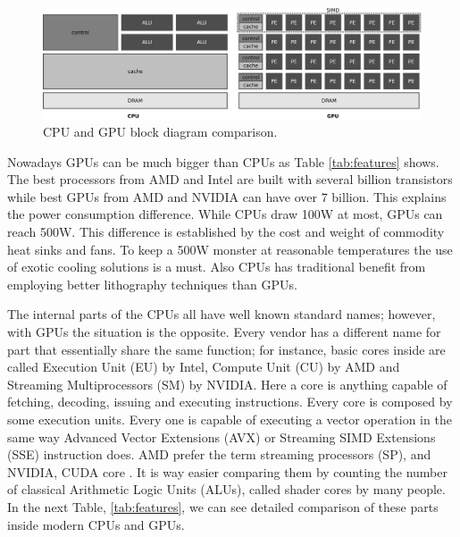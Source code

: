 \documentclass{article}
\begin{document}
\begin{figure}[!ht]
\centering
\includegraphics[width=\textwidth]{cpu-gpu.eps}
\caption{CPU and GPU block diagram comparison.}
\label{fig:cpu-gpu}
\end{figure}

Nowadays GPUs can be much bigger than CPUs as Table \ref{tab:features}
shows. The best processors from AMD and Intel are built with several
billion transistors while best GPUs from AMD and NVIDIA can have over
7 billion. This explains the power consumption difference. While CPUs
draw 100W at most, GPUs can reach 500W. This difference is established
by the cost and weight of commodity heat sinks and fans. To keep a
500W monster at reasonable temperatures the use of exotic cooling
solutions is a must. Also CPUs has traditional benefit from employing
better lithography techniques than GPUs.  %

The internal parts of the CPUs all have well known standard names;
however, with GPUs the situation is the opposite. Every vendor has a
different name for part that essentially share the same function; for
instance, basic cores %
inside are called Execution Unit (EU) by Intel, Compute Unit (CU) by
AMD and Streaming Multiprocessors (SM) by NVIDIA. Here a core is
anything capable of fetching, decoding, issuing and executing
instructions. Every core is composed by some execution units. Every one
is capable of executing a vector operation in the same way Advanced Vector Extensions (AVX) or Streaming SIMD Extensions (SSE) instruction does. AMD prefer the term streaming processors (SP), and
NVIDIA, CUDA core \cite{YangCUDA15}. It is way easier comparing them by counting the
number of classical Arithmetic Logic Units (ALUs), called shader cores
by many people. In the next Table, \ref{tab:features}, we can see
detailed comparison of these parts inside modern CPUs and GPUs.
\end{document}
